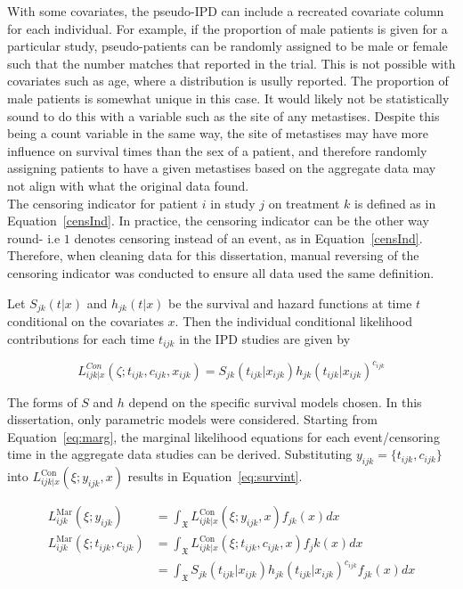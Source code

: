 With some covariates, the pseudo-IPD can include a recreated covariate column for each individual. For example, if the proportion of male patients is given for a particular study, pseudo-patients can be randomly assigned to be male or female such that the number matches that reported in the trial. This is not possible with covariates such as age, where a distribution is usully reported. The proportion of male patients is somewhat unique in this case. It would likely not be statistically sound to do this with a variable such as the site of any metastises. Despite this being a count variable in the same way, the site of metastises may have more influence on survival times than the sex of a patient, and therefore randomly assigning patients to have a given metastises based on the aggregate data may not align with what the original data found. \\ 

The censoring indicator for patient $i$ in study $j$ on treatment $k$ is defined as in Equation~\ref{censInd}. In practice, the censoring indicator can be the other way round- i.e $1$ denotes censoring instead of an event, as in Equation~\ref{censInd}. Therefore, when cleaning data for this dissertation, manual reversing of the censoring indicator was conducted to ensure all data used the same definition. 

Let $S_{jk}(t|x)$ and $h_{jk}(t|x)$ be the survival and hazard functions at time $t$ conditional on the covariates $x$. Then the individual conditional likelihood contributions for each time $t_{ijk}$ in the IPD studies are given by

\begin{equation}
    L_{ijk|x}^{Con}(\zeta;t_{ijk},c_{ijk},x_{ijk}) = S_{jk}(t_{ijk}| x_{ijk})h_{jk}(t_{ijk}|x_{ijk})^{c_{ijk}}
\end{equation}

The forms of $S$ and $h$ depend on the specific survival models chosen. In this dissertation, only parametric models were considered. Starting from Equation~\ref{eq:marg}, the marginal likelihood equations for each event/censoring time in the aggregate data studies can be derived. Substituting $y_{ijk} = \{t_{ijk}, c_{ijk}\}$ into $L_{ijk|x}^{\text{Con}}(\xi; y_{ijk}, x)$ results in Equation~\ref{eq:survint}.

\begin{align}
    L_{ijk}^{\text{Mar}}(\xi; y_{ijk}) &= \int_{\mathfrak{X}} L_{ijk|x}^{\text{Con}}(\xi; y_{ijk}, x)f_{jk}(x)dx \\ 
    L_{ijk}^{\text{Mar}}(\xi; t_{ijk}, c_{ijk}) &= \int_{\mathfrak{X}} L_{ijk|x}^{\text{Con}}(\xi; t_{ijk}, c_{ijk}, x)f_jk(x)dx \\
                                       &= \int_{\mathfrak{X}} S_{jk}(t_{ijk}| x_{ijk})h_{jk}(t_{ijk}|x_{ijk})^{c_{ijk}} f_{jk}(x)dx\label{eq:survint}
\end{align}

